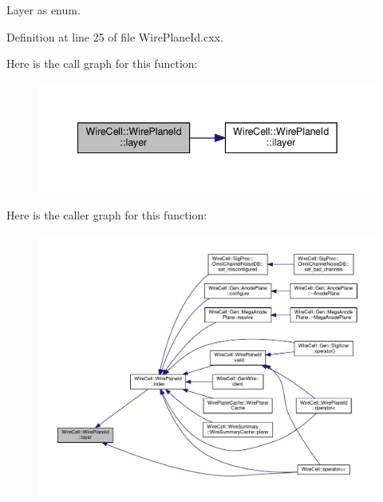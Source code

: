 Layer as enum. 



Definition at line 25 of file Wire\+Plane\+Id.\+cxx.

Here is the call graph for this function\+:
\nopagebreak
\begin{figure}[H]
\begin{center}
\leavevmode
\includegraphics[width=342pt]{class_wire_cell_1_1_wire_plane_id_a203ede27a759b00518be11b8d23776fd_cgraph}
\end{center}
\end{figure}
Here is the caller graph for this function\+:
\nopagebreak
\begin{figure}[H]
\begin{center}
\leavevmode
\includegraphics[width=350pt]{class_wire_cell_1_1_wire_plane_id_a203ede27a759b00518be11b8d23776fd_icgraph}
\end{center}
\end{figure}
\mbox{\label{class_wire_cell_1_1_wire_plane_id_abdf61c8300e6e748240da00871108471}} 
